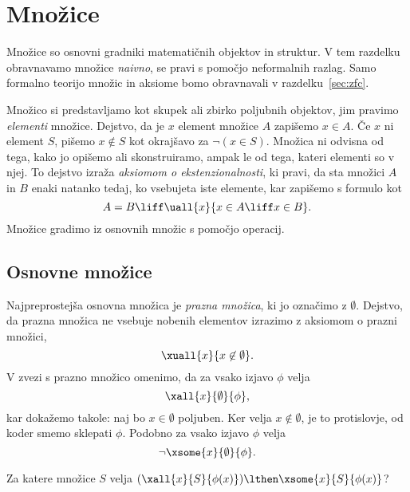 \section{Množice}
\label{sec:naivne-mnozice}

Množice so osnovni gradniki matematičnih objektov in struktur. V tem razdelku obravnavamo množice \emph{naivno}, se pravi s pomočjo neformalnih razlag. Samo formalno teorijo množic in aksiome bomo obravnavali v razdelku~\ref{sec:zfc}.

Množico si predstavljamo kot skupek ali zbirko poljubnih objektov, jim pravimo \emph{elementi} množice. Dejstvo, da je $x$ element množice $A$ zapišemo $x \in A$. Če $x$ ni element $S$, pišemo $x \not\in S$ kot okrajšavo za $\lnot (x \in S)$. Množica ni odvisna od tega, kako jo opišemo ali skonstruiramo, ampak le od tega, kateri elementi so v njej. To dejstvo izraža \emph{aksiomom o ekstenzionalnosti}, ki pravi, da sta množici $A$ in $B$ enaki natanko tedaj, ko vsebujeta iste elemente, kar zapišemo s formulo kot
%
\begin{equation*}
  A = B \liff \uall{x}{x \in A \liff x \in B}.
\end{equation*}
%
Množice gradimo iz osnovnih množic s pomočjo operacij.

\subsection{Osnovne množice}
\label{sec:osnovne-mnozice}

Najpreprostejša osnovna množica je \emph{prazna množica}, ki jo označimo z $\emptyset$. Dejstvo, da prazna množica ne vsebuje nobenih elementov izrazimo z aksiomom o prazni množici,
%
\begin{equation*}
  \xuall{x}{x \not\in \emptyset}.
\end{equation*}
%
V zvezi s prazno množico omenimo, da za vsako izjavo $\phi$ velja
%
\begin{equation*}
  \xall{x}{\emptyset}{\phi},
\end{equation*}
%
kar dokažemo takole: naj bo $x \in \emptyset$ poljuben. Ker velja $x \not\in \emptyset$, je to protislovje, od koder smemo sklepati $\phi$. Podobno za vsako izjavo $\phi$ velja
%
\begin{equation*}
  \lnot\xsome{x}{\emptyset}{\phi}.
\end{equation*}

\begin{vaja}
  Za katere množice $S$ velja $(\xall{x}{S}{\phi(x)}) \lthen   \xsome{x}{S}{\phi(x)}$?
\end{vaja}

